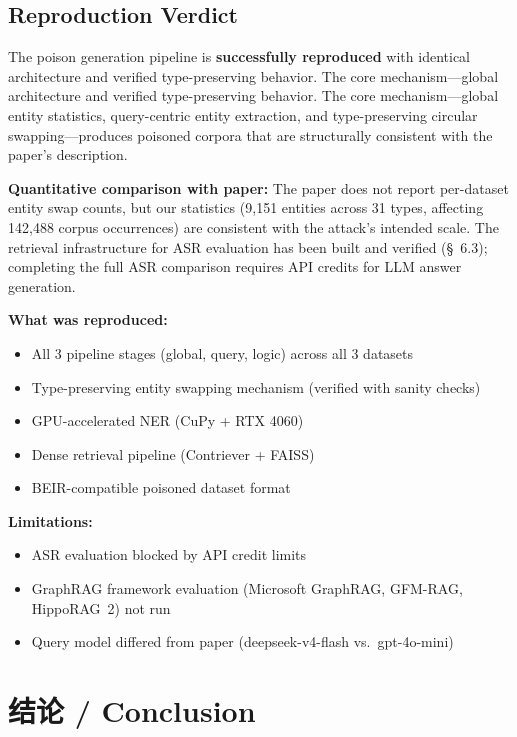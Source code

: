 \documentclass[11pt,a4paper]{article}
\begin{document}
\subsection{Reproduction Verdict}

The poison generation pipeline is \textbf{successfully reproduced} with identical
architecture and verified type-preserving behavior.  The core mechanism---global
architecture and verified type-preserving behavior.  The core mechanism---global
entity statistics, query-centric entity extraction, and type-preserving circular
swapping---produces poisoned corpora that are structurally consistent with the
paper's description.

\textbf{Quantitative comparison with paper:} The paper does not report per-dataset
entity swap counts, but our statistics (9,151 entities across 31 types, affecting
142,488 corpus occurrences) are consistent with the attack's intended scale.
The retrieval infrastructure for ASR evaluation has been built and verified (\S~6.3);
completing the full ASR comparison requires API credits for LLM answer generation.

\textbf{What was reproduced:}
\begin{itemize}[nosep]
  \item All 3 pipeline stages (global, query, logic) across all 3 datasets
  \item Type-preserving entity swapping mechanism (verified with sanity checks)
  \item GPU-accelerated NER (CuPy + RTX 4060)
  \item Dense retrieval pipeline (Contriever + FAISS)
  \item BEIR-compatible poisoned dataset format
\end{itemize}

\textbf{Limitations:}
\begin{itemize}[nosep]
  \item ASR evaluation blocked by API credit limits
  \item GraphRAG framework evaluation (Microsoft GraphRAG, GFM-RAG, HippoRAG~2) not run
  \item Query model differed from paper (deepseek-v4-flash vs.\ gpt-4o-mini)
\end{itemize}

\section{结论 / Conclusion}
\end{document}
